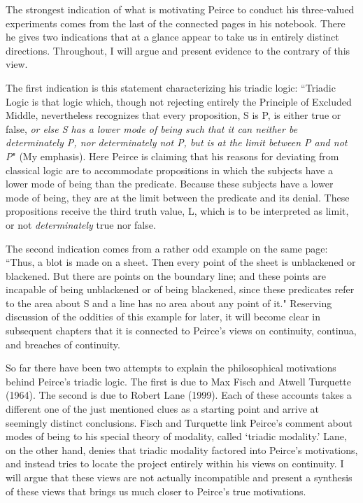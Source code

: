 \documentclass[12pt]{article}
\begin{document}
The strongest indication of what is motivating Peirce to conduct his three-valued experiments comes from the last of the connected pages in his notebook. There he gives two indications that at a glance appear to take us in entirely distinct directions. Throughout, I will argue and present evidence to the contrary of this view.

The first indication is this statement characterizing his triadic logic: ``Triadic Logic is that logic which, though not rejecting entirely the Principle of Excluded Middle, nevertheless recognizes that every proposition, S is P, is either true or false, \textit{or else S has a lower mode of being such that it can neither be determinately P, nor determinately not P, but is at the limit between P and not P}" (My emphasis). Here Peirce is claiming that his reasons for deviating from classical logic are to accommodate propositions in which the subjects have a lower mode of being than the predicate. Because these subjects have a lower mode of being, they are at the limit between the predicate and its denial. These propositions receive the third truth value, L, which is to be interpreted as limit, or not \textit{determinately} true nor false.

The second indication comes from a rather odd example on the same page: ``Thus, a blot is made on a sheet. Then every point of the sheet is unblackened or blackened. But there are points on the boundary line; and these points are incapable of being unblackened or of being blackened, since these predicates refer to the area about S and a line has no area about any point of it." Reserving discussion of the oddities of this example for later, it will become clear in subsequent chapters that it is connected to Peirce's views on continuity, continua, and breaches of continuity.

So far there have been two attempts to explain the philosophical motivations behind Peirce's triadic logic. The first is due to Max Fisch and Atwell Turquette (1964). The second is due to Robert Lane (1999). Each of these accounts takes a different one of the just mentioned clues as a starting point and arrive at seemingly distinct conclusions. Fisch and Turquette link Peirce's comment about modes of being to his special theory of modality, called `triadic modality.' Lane, on the other hand, denies that triadic modality factored into Peirce's motivations, and instead tries to locate the project entirely within his views on continuity. I will argue that these views are not actually incompatible and present a synthesis of these views that brings us much closer to Peirce's true motivations.
\end{document}
